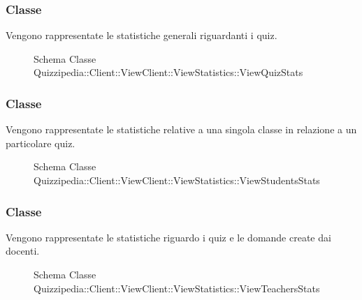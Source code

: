\subsubsection{Classe }
Vengono rappresentate le statistiche generali riguardanti i quiz.
\begin{figure}[H]
\centering
\noindent{}
\caption[Schema Classe ViewQuizStats]{Schema Classe Quizzipedia::Client::ViewClient::ViewStatistics::ViewQuizStats}
\end{figure}
\subsubsection{Classe }
Vengono rappresentate le statistiche relative a una singola classe in relazione a un particolare quiz.
\begin{figure}[H]
\centering
\noindent{}
\caption[Schema Classe ViewStudentsStats]{Schema Classe Quizzipedia::Client::ViewClient::ViewStatistics::ViewStudentsStats}
\end{figure}
\subsubsection{Classe }
Vengono rappresentate le statistiche riguardo i quiz e le domande create dai docenti.
\begin{figure}[H]
\centering
\noindent{}
\caption[Schema Classe ViewTeachersStats]{Schema Classe Quizzipedia::Client::ViewClient::ViewStatistics::ViewTeachersStats}
\end{figure}
